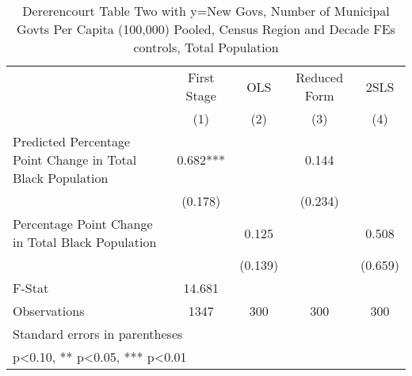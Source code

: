 \begin{table}[htbp]\centering
\def\sym#1{\ifmmode^{#1}\else\(^{#1}\)\fi}
\caption{Dererencourt Table Two with y=New Govs, Number of Municipal Govts Per Capita (100,000) Pooled, Census Region and Decade FEs controls, Total Population}
\begin{tabular}{l*{4}{c}}
\toprule
                    & First Stage   &         OLS   &Reduced Form   &        2SLS   \\
                    &\multicolumn{1}{c}{(1)}   &\multicolumn{1}{c}{(2)}   &\multicolumn{1}{c}{(3)}   &\multicolumn{1}{c}{(4)}   \\
\midrule
Predicted Percentage Point Change in Total Black Population&       0.682***&               &       0.144   &               \\
                    &     (0.178)   &               &     (0.234)   &               \\
\addlinespace
Percentage Point Change in Total Black Population&               &       0.125   &               &       0.508   \\
                    &               &     (0.139)   &               &     (0.659)   \\
\midrule
F-Stat              &      14.681   &               &               &               \\
Observations        &        1347   &         300   &         300   &         300   \\
\bottomrule
\multicolumn{5}{l}{\footnotesize Standard errors in parentheses}\\
\multicolumn{5}{l}{\footnotesize * p<0.10, ** p<0.05, *** p<0.01}\\
\end{tabular}
\end{table}
